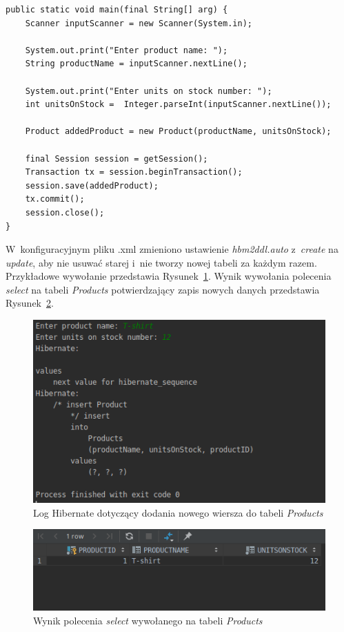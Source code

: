 \documentclass[12pt, a4paper]{mwart}
\begin{document}
\begin{lstlisting}
public static void main(final String[] arg) {
	Scanner inputScanner = new Scanner(System.in);

	System.out.print("Enter product name: ");
	String productName = inputScanner.nextLine();

	System.out.print("Enter units on stock number: ");
	int unitsOnStock =  Integer.parseInt(inputScanner.nextLine());

	Product addedProduct = new Product(productName, unitsOnStock);

	final Session session = getSession();
	Transaction tx = session.beginTransaction();
	session.save(addedProduct);
	tx.commit();
	session.close();
}
\end{lstlisting}

W~konfiguracyjnym pliku .xml zmieniono ustawienie \textit{hbm2ddl.auto} z~\textit{create} na \textit{update}, aby nie usuwać starej i~nie tworzy nowej tabeli za każdym razem. Przykładowe wywołanie przedstawia Rysunek~\ref{rys:2.4}. Wynik wywołania polecenia \textit{select} na tabeli \textit{Products} potwierdzający zapis nowych danych przedstawia Rysunek~\ref{rys:2.5}.

\begin{figure}[ht]
  \centering
  \includegraphics[scale=0.75]{II/2-4.png}
  \caption{Log Hibernate dotyczący dodania nowego wiersza do tabeli \textit{Products}}
  \label{rys:2.4}
\end{figure}

\begin{figure}[ht]
  \centering
  \includegraphics[scale=0.5]{II/2-5.png}
  \caption{Wynik polecenia \textit{select} wywołanego na tabeli \textit{Products}}
  \label{rys:2.5}
\end{figure}
\end{document}
